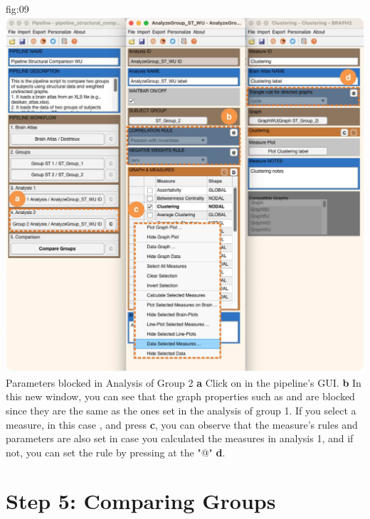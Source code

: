\documentclass[justified]{tufte-handout}
\begin{document}
	{fig:09}
	{\includegraphics{fig09.jpg}}
	{Parameters blocked in Analysis of Group 2}
	{
	{\bf a} Click on  in the pipeline's GUI.
	{\bf b} In this new window, you can see that the graph properties such as  and  are blocked since they are the same as the ones set in the analysis of group 1. If you select a measure, in this case , and press  {\bf c}, you can observe that the measure's rules and parameters are also set in case you calculated the measures in analysis 1, and if not, you can set the rule by pressing at the "@" {\bf d}.
	}

 
\section{Step 5: Comparing Groups}
\end{document}
